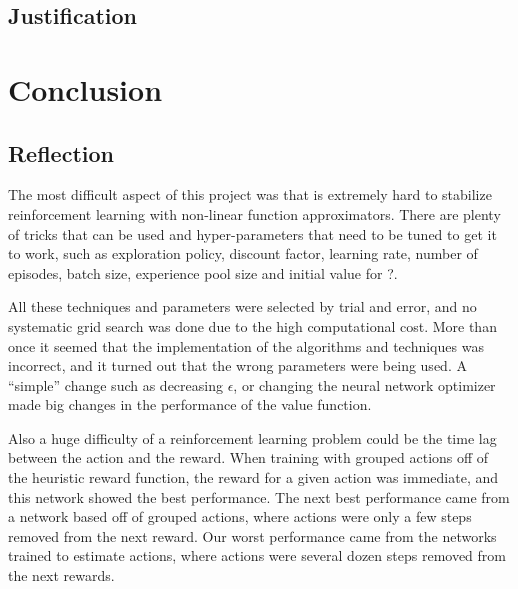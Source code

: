 \documentclass[a4paper]{article}
\begin{document}
\subsection{Justification}



\section{Conclusion}

\subsection{Reflection}

The most difficult aspect of this project was that is extremely hard to stabilize reinforcement learning with non-linear function approximators. There are plenty of tricks that can be used and hyper-parameters that need to be tuned to get it to work, such as exploration policy, discount factor, learning rate, number of episodes, batch size, experience pool size  and initial value for ?.

All these techniques and parameters were selected by trial and error, and no systematic grid search was done due to the high computational cost. More than once it seemed that the implementation of the algorithms and techniques was incorrect, and it turned out that the wrong parameters were being used. A ``simple'' change such as decreasing $\epsilon$, or changing the neural network optimizer made big changes in the performance of the value function.

Also a huge difficulty of a reinforcement learning problem could be the time lag between the action and the reward. When training with grouped actions off of the heuristic reward function, the reward for a given action was immediate, and this network showed the best performance. The next best performance came from a network based off of grouped actions, where actions were only a few steps removed from the next reward. Our worst performance came from the networks trained to estimate actions, where actions were several dozen steps removed from the next rewards.
\end{document}
